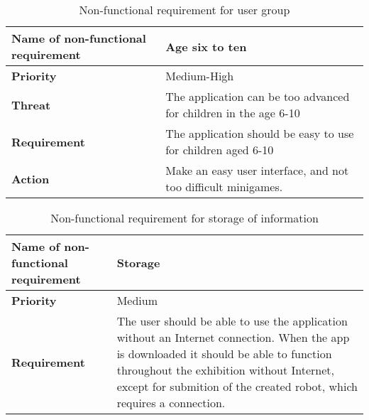 \begin{table}[!h]
\caption{Non-functional requirement for user group}
\begin{tabular}{ |p{7cm}|p{7cm}| }
\hline
\textbf {Name of non-functional requirement} & {Age six to ten} \\ \hline
\textbf {Priority} & {Medium-High} \\ \hline
\textbf {Threat} & {The application can be too advanced for children in the age 6-10} \\ \hline
\textbf {Requirement} & {The application should be easy to use for children aged 6-10} \\ \hline
\textbf {Action} & {Make an easy user interface, and not too difficult minigames.} \\ \hline
\end{tabular}
\end{table}

\begin{table}[!h]
\caption{Non-functional requirement for storage of information}
\begin{tabular}{ |p{7cm}|p{7cm}| }
\hline
\textbf {Name of non-functional requirement} & {Storage} \\ \hline
\textbf {Priority} & {Medium} \\ \hline
\textbf {Requirement} & {The user should be able to use the application without an Internet connection. When the app is downloaded it should be able to function throughout the exhibition without Internet, except for submition of the created robot, which requires a connection.} \\ \hline
\end{tabular}
\end{table}